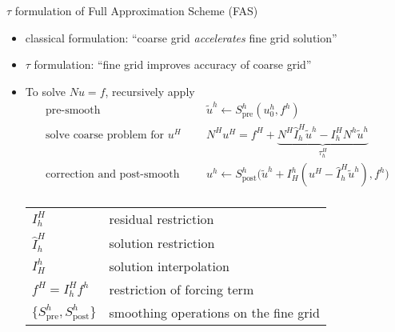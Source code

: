 \begin{frame}{$\tau$ formulation of Full Approximation Scheme (FAS)}
  \begin{itemize}
  \item classical formulation: ``coarse grid \emph{accelerates} fine grid solution''
  \item $\tau$ formulation: ``fine grid improves accuracy of coarse grid''
  \item To solve $N u = f$, recursively apply
    \begin{equation*}
      \begin{split}
        \text{pre-smooth} \:\: & \quad \tilde u^h \gets S^h_{\text{pre}}(u^h_0, f^h) \\
        \text{solve coarse problem for $u^H$} \:\: & \quad N^H u^H = f^H + \underbrace{N^H \hat I_h^H \tilde u^h - I_h^H N^h \tilde u^h}_{\tau_h^H} \\
        \text{correction and post-smooth} \:\: & \quad u^h \gets S^h_{\text{post}} \Big( \tilde u^h + I_H^h (u^H - \hat I_h^H \tilde u^h), f^h \Big) \\
      \end{split}
    \end{equation*}
    \begin{tabular}{ll}
      \toprule
      $I_h^H$ & residual restriction \\
      $\hat I_h^H$ & solution restriction \\
      $I_H^h$ & solution interpolation \\
      $f^H = I_h^H f^h$ & restriction of forcing term \\
      $\{S^h_{\text{pre}},S^h_{\text{post}}\}$ & smoothing operations on the fine grid \\
      \bottomrule
    \end{tabular}
  \end{itemize}
\end{frame}

